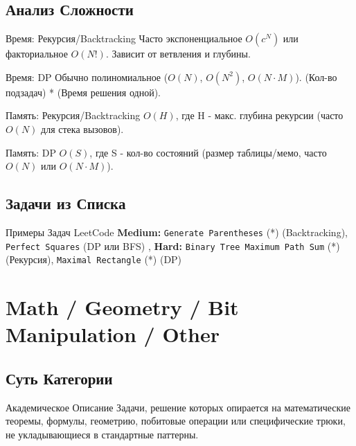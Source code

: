 \subsection{Анализ Сложности}
\begin{myblock}{Время: Рекурсия/Backtracking}
    Часто экспоненциальное $O(c^N)$ или факториальное $O(N!)$. Зависит от ветвления и глубины.
\end{myblock}
\begin{myblock}{Время: DP}
    Обычно полиномиальное ($O(N)$, $O(N^2)$, $O(N \cdot M)$). (Кол-во подзадач) * (Время решения одной).
\end{myblock}
\begin{myblock}{Память: Рекурсия/Backtracking}
    $O(H)$, где H - макс. глубина рекурсии (часто $O(N)$ для стека вызовов).
\end{myblock}
\begin{myblock}{Память: DP}
    $O(S)$, где S - кол-во состояний (размер таблицы/мемо, часто $O(N)$ или $O(N \cdot M)$).
\end{myblock}

\subsection{Задачи из Списка}
\begin{myblock}{Примеры Задач LeetCode}
    \textbf{Medium:} \texttt{Generate Parentheses} (*) (Backtracking), \texttt{Perfect Squares} (DP или BFS) \sep
    \textbf{Hard:} \texttt{Binary Tree Maximum Path Sum} (*) (Рекурсия), \texttt{Maximal Rectangle} (*) (DP)
\end{myblock}

\section{Math / Geometry / Bit Manipulation / Other}

\subsection{Суть Категории}
\begin{myblock}{Академическое Описание}
    Задачи, решение которых опирается на математические теоремы, формулы, геометрию, побитовые операции или специфические трюки, не укладывающиеся в стандартные паттерны.
\end{myblock}

